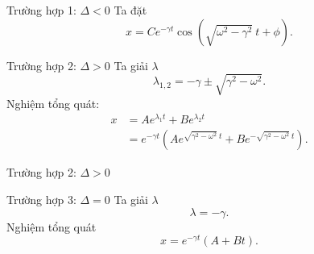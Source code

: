 \begin{frame}{Trường hợp 1: \(\Delta <0\)}
    Ta đặt
    \begin{equation}
        x = C e^{-\gamma t}  \cos{\left(\sqrt{\omega^2 - \gamma^2} \ t + \phi \right)}.
    \end{equation}
\end{frame}
\begin{frame}{Trường hợp 2: \(\Delta > 0\)}
    Ta giải \(\lambda\)
    \begin{equation*}
        \lambda_{1,2} =  - \gamma \pm  \sqrt{\gamma^2 - \omega^2}.
    \end{equation*}    
    Nghiệm tổng quát:
    \begin{equation}
    \begin{array}{cl}
    x &= A e^{\lambda_1 t} + B e^{\lambda_2 t} \\
    &= e^{-\gamma t} \left(A e^{\sqrt{\gamma^2 - \omega^2} \ t} + B e^{- \sqrt{\gamma^2 - \omega^2} \ t} \right).
    \end{array}
    \end{equation}
\end{frame}
\begin{frame}{Trường hợp 2: \(\Delta > 0\)}
    
\end{frame}
\begin{frame}{Trường hợp 3: \(\Delta = 0\)}
    Ta giải \(\lambda\)
    \begin{equation*}
        \lambda =  - \gamma.
    \end{equation*} 
    Nghiệm tổng quát
    \begin{equation}
        x = e^{-\gamma t} \left(A + Bt \right).
    \end{equation}
\end{frame}
